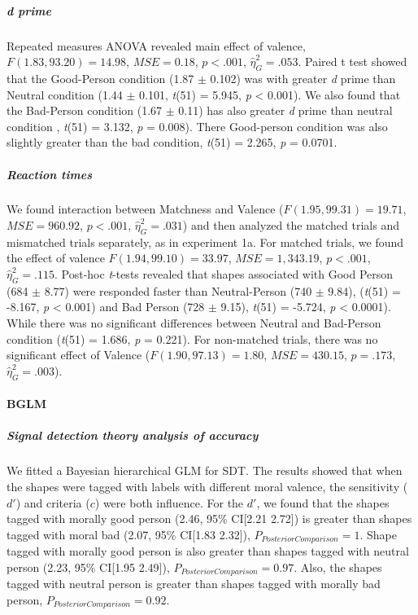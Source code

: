 \documentclass[
  english,
  man]{apa6}
\let\oldparagraph\paragraph
\renewcommand{\paragraph}[1]{\oldparagraph{#1}\mbox{}}
\let\oldsubparagraph\subparagraph
\renewcommand{\subparagraph}[1]{\oldsubparagraph{#1}\mbox{}}
\begin{document}
\hypertarget{d-prime-1}{%
\subparagraph{d prime}\label{d-prime-1}}

Repeated measures ANOVA revealed main effect of valence, \(F(1.83, 93.20) = 14.98\), \(\mathit{MSE} = 0.18\), \(p < .001\), \(\hat{\eta}^2_G = .053\). Paired t test showed that the Good-Person condition (1.87 \(\pm\) 0.102) was with greater \emph{d} prime than Neutral condition (1.44 \(\pm\) 0.101, \emph{t}(51) = 5.945, \emph{p} \textless{} 0.001). We also found that the Bad-Person condition (1.67 \(\pm\) 0.11) has also greater \emph{d} prime than neutral condition , \emph{t}(51) = 3.132, \emph{p} = 0.008). There Good-person condition was also slightly greater than the bad condition, \emph{t}(51) = 2.265, \emph{p} = 0.0701.

\hypertarget{reaction-times-1}{%
\subparagraph{Reaction times}\label{reaction-times-1}}

We found interaction between Matchness and Valence (\(F(1.95, 99.31) = 19.71\), \(\mathit{MSE} = 960.92\), \(p < .001\), \(\hat{\eta}^2_G = .031\)) and then analyzed the matched trials and mismatched trials separately, as in experiment 1a. For matched trials, we found the effect of valence \(F(1.94, 99.10) = 33.97\), \(\mathit{MSE} = 1,343.19\), \(p < .001\), \(\hat{\eta}^2_G = .115\). Post-hoc \emph{t}-tests revealed that shapes associated with Good Person (684 \(\pm\) 8.77) were responded faster than Neutral-Person (740 \(\pm\) 9.84), (\emph{t}(51) = -8.167, \emph{p} \textless{} 0.001) and Bad Person (728 \(\pm\) 9.15), \emph{t}(51) = -5.724, \emph{p} \textless{} 0.0001). While there was no significant differences between Neutral and Bad-Person condition (\emph{t}(51) = 1.686, \emph{p} = 0.221). For non-matched trials, there was no significant effect of Valence (\(F(1.90, 97.13) = 1.80\), \(\mathit{MSE} = 430.15\), \(p = .173\), \(\hat{\eta}^2_G = .003\)).

\hypertarget{bglm}{%
\paragraph{BGLM}\label{bglm}}

\hypertarget{signal-detection-theory-analysis-of-accuracy}{%
\subparagraph{Signal detection theory analysis of accuracy}\label{signal-detection-theory-analysis-of-accuracy}}

We fitted a Bayesian hierarchical GLM for SDT. The results showed that when the shapes were tagged with labels with different moral valence, the sensitivity (\(d'\)) and criteria (\(c\)) were both influence. For the \(d'\), we found that the shapes tagged with morally good person (2.46, 95\% CI{[}2.21 2.72{]}) is greater than shapes tagged with moral bad (2.07, 95\% CI{[}1.83 2.32{]}), \(P_{PosteriorComparison} = 1\). Shape tagged with morally good person is also greater than shapes tagged with neutral person (2.23, 95\% CI{[}1.95 2.49{]}), \(P_{PosteriorComparison} = 0.97\). Also, the shapes tagged with neutral person is greater than shapes tagged with morally bad person, \(P_{PosteriorComparison} = 0.92\).
\end{document}
